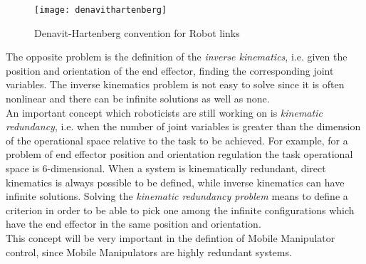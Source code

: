 \begin{figure}[h!]
	\centering
	\texttt{[image: denavithartenberg]}
	\caption{Denavit-Hartenberg convention for Robot links}
	\label{fig:DH}
\end{figure}

The opposite problem is the definition of the \textit{inverse kinematics}, i.e. given the position and orientation of the end effector, finding the corresponding joint variables. The inverse kinematics problem is not easy to solve since it is often nonlinear and there can be infinite solutions as well as none.\\
An important concept which roboticists are still working on is \textit{kinematic redundancy}, i.e. when the number of joint variables is greater than the dimension of the operational space relative to the task to be achieved. For example, for a problem of end effector position and orientation regulation the task operational space is 6-dimensional.
When a system is kinematically redundant, direct kinematics is always possible to be defined, while inverse kinematics can have infinite solutions.
Solving the \textit{kinematic redundancy problem} means to define a criterion in order to be able to pick one among the infinite configurations which have the end effector in the same position and orientation.\\
This concept will be very important in the defintion of Mobile Manipulator control, since Mobile Manipulators are highly redundant systems.

